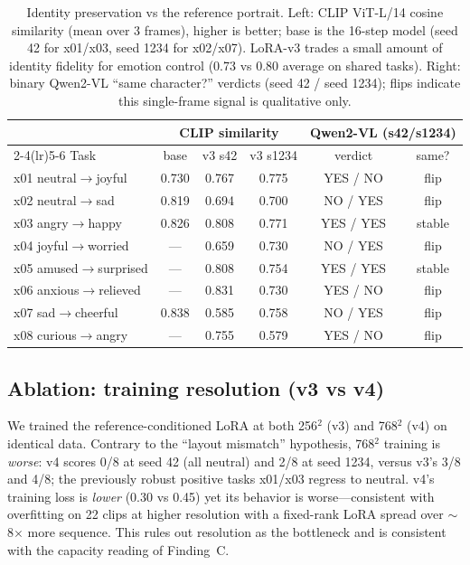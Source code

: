 \documentclass{article}
\begin{document}
\begin{table}[t]
\centering\small
\caption{Identity preservation vs the reference portrait. Left: CLIP ViT-L/14 cosine similarity
(mean over 3 frames), higher is better; base is the 16-step model (seed 42 for x01/x03, seed 1234
for x02/x07). LoRA-v3 trades a small amount of identity fidelity for emotion control (0.73 vs 0.80
average on shared tasks). Right: binary Qwen2-VL ``same character?'' verdicts (seed 42 / seed 1234);
flips indicate this single-frame signal is qualitative only.}
\label{tab:identity}
\begin{tabular}{@{}lccccc@{}}
\toprule
 & \multicolumn{3}{c}{CLIP similarity} & \multicolumn{2}{c}{Qwen2-VL (s42/s1234)}\\
\cmidrule(lr){2-4}\cmidrule(lr){5-6}
Task & base & v3 s42 & v3 s1234 & verdict & same?\\
\midrule
x01 neutral$\rightarrow$joyful & 0.730 & 0.767 & 0.775 & YES / NO & flip\\
x02 neutral$\rightarrow$sad & 0.819 & 0.694 & 0.700 & NO / YES & flip\\
x03 angry$\rightarrow$happy & 0.826 & 0.808 & 0.771 & YES / YES & stable\\
x04 joyful$\rightarrow$worried & --- & 0.659 & 0.730 & NO / YES & flip\\
x05 amused$\rightarrow$surprised & --- & 0.808 & 0.754 & YES / YES & stable\\
x06 anxious$\rightarrow$relieved & --- & 0.831 & 0.730 & YES / NO & flip\\
x07 sad$\rightarrow$cheerful & 0.838 & 0.585 & 0.758 & NO / YES & flip\\
x08 curious$\rightarrow$angry & --- & 0.755 & 0.579 & YES / NO & flip\\
\bottomrule
\end{tabular}
\end{table}

\subsection{Ablation: training resolution (v3 vs v4)}
We trained the reference-conditioned LoRA at both 256$^2$ (v3) and 768$^2$ (v4) on identical data.
Contrary to the ``layout mismatch'' hypothesis, 768$^2$ training is \emph{worse}: v4 scores 0/8 at
seed 42 (all neutral) and 2/8 at seed 1234, versus v3's 3/8 and 4/8; the previously robust positive
tasks x01/x03 regress to neutral. v4's training loss is \emph{lower} (0.30 vs 0.45) yet its
behavior is worse---consistent with overfitting on 22 clips at higher resolution with a fixed-rank
LoRA spread over $\sim$8$\times$ more sequence. This rules out resolution as the bottleneck and
is consistent with the capacity reading of Finding~C.
\end{document}
